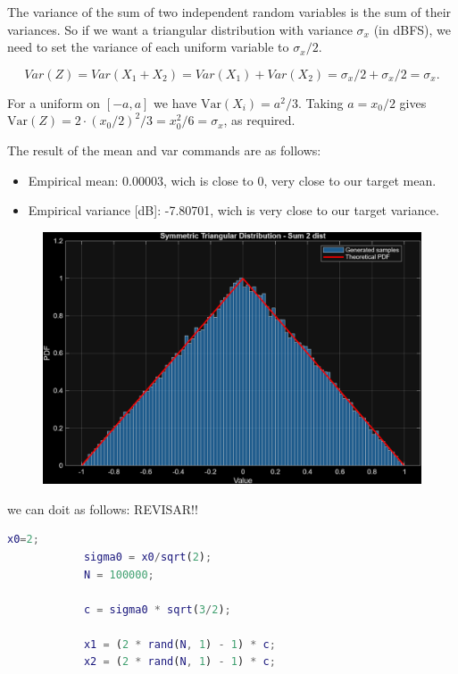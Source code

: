\documentclass[11pt,a4paper]{article}
\begin{document}
\begin{itemize}
    The variance of the sum of two independent random variables is the sum of their variances.
    So if we want a triangular distribution with variance $\sigma_x$ (in dBFS), we need to set the variance of each uniform variable to $\sigma_x/2$.
    
    \[
    Var(Z) = Var(X_1 + X_2) = Var(X_1) + Var(X_2) = \sigma_x/2 + \sigma_x/2 = \sigma_x.
    \]

    For a uniform on \([-a,a]\) we have \(\mathrm{Var}(X_i)=a^{2}/3\). Taking \(a=x_0/2\) gives \(\mathrm{Var}(Z)=2\cdot (x_0/2)^2/3 = x_0^2/6 = \sigma_x\), as required.

    The result of the mean and var commands are as follows:
    \begin{itemize}
        \item Empirical mean: 0.00003, wich is close to 0, very close to our target mean.
        \item Empirical variance [dB]: -7.80701, wich is very close to our target variance.
    \end{itemize}
    
    \begin{figure}[H]
        \centering
        \includegraphics[width=1\textwidth]{img/task3_tri_sum2uniform.png}
        \label{fig:task3_tri_sum2uniform}
    \end{figure}

    we can doit as follows: REVISAR!!
        \begin{lstlisting}[language=Matlab]
            x0=2;
            sigma0 = x0/sqrt(2);
            N = 100000;
            
            c = sigma0 * sqrt(3/2);

            x1 = (2 * rand(N, 1) - 1) * c;
            x2 = (2 * rand(N, 1) - 1) * c;


\end{lstlisting}
\end{itemize}
\end{document}
